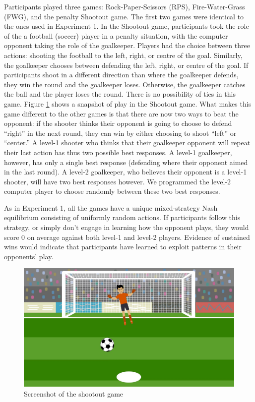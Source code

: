 \documentclass[smallextended]{svjour3}       %
\begin{document}
Participants played three games: Rock-Paper-Scissors (RPS),
Fire-Water-Grass (FWG), and the penalty Shootout game. The first two
games were identical to the ones used in Experiment 1. In the Shootout
game, participants took the role of the a football (soccer) player in a
penalty situation, with the computer opponent taking the role of the
goalkeeper. Players had the choice between three actions: shooting the
football to the left, right, or centre of the goal. Similarly, the
goalkeeper chooses between defending the left, right, or centre of the
goal. If participants shoot in a different direction than where the
goalkeeper defends, they win the round and the goalkeeper loses.
Otherwise, the goalkeeper catches the ball and the player loses the
round. There is no possibility of ties in this game. Figure
\ref{fig:screenshot-shootout} shows a snapshot of play in the Shootout
game. What makes this game different to the other games is that there
are now two ways to beat the opponent: if the shooter thinks their
opponent is going to choose to defend ``right'' in the next round, they
can win by either choosing to shoot ``left'' or ``center.'' A level-1
shooter who thinks that their goalkeeper opponent will repeat their last
action has thus two possible best responses. A level-1 goalkeeper,
however, has only a single best response (defending where their opponent
aimed in the last round). A level-2 goalkeeper, who believes their
opponent is a level-1 shooter, will have two best responses however. We
programmed the level-2 computer player to choose randomly between these
two best responses.

As in Experiment 1, all the games have a unique mixed-strategy Nash
equilibrium consisting of uniformly random actions. If participants
follow this strategy, or simply don't engage in learning how the
opponent plays, they would score 0 on average against both level-1 and
level-2 players. Evidence of sustained wins would indicate that
participants have learned to exploit patterns in their opponents' play.

\begin{figure}

{\centering \includegraphics[width=\textwidth]{../images/shootout} 

}

\caption{Screenshot of the shootout game}\label{fig:screenshot-shootout}
\end{figure}
\end{document}
